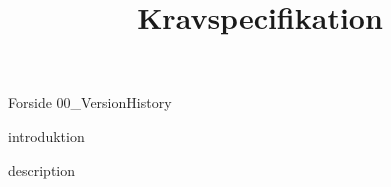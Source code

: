 \documentclass[a4paper,openany]{memoir}
\title{Kravspecifikation}
\begin{document}
	{Forside}  \newpage
	\tableofcontents\thispagestyle{fancy}
	{00_VersionHistory}  \newpage

	{introduktion} \newpage

	{description}  \newpage

	 {}
	\printbibliography
\end{document}
